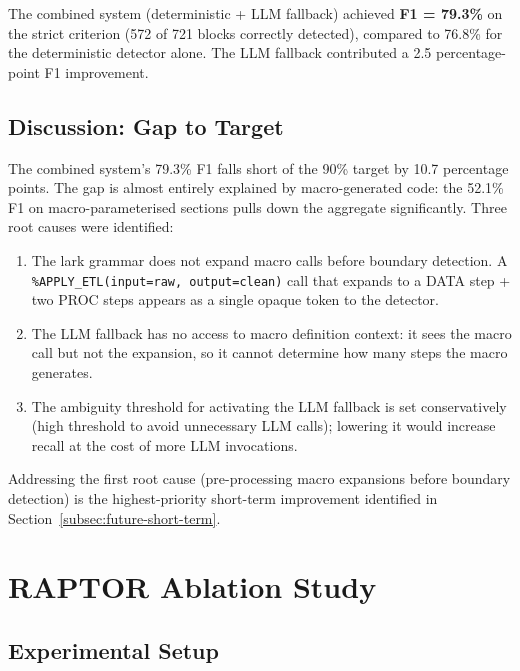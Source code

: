 The combined system (deterministic + LLM fallback) achieved \textbf{F1 = 79.3\%}
on the strict criterion (572 of 721 blocks correctly detected), compared to
76.8\% for the deterministic detector alone.
The LLM fallback contributed a 2.5 percentage-point F1 improvement.

\subsection{Discussion: Gap to Target}
\label{subsec:boundary-gap}

The combined system's 79.3\% F1 falls short of the 90\% target by 10.7
percentage points. The gap is almost entirely explained by macro-generated code:
the 52.1\% F1 on macro-parameterised sections pulls down the aggregate
significantly. Three root causes were identified:

\begin{enumerate}
  \item The lark grammar does not expand macro calls before boundary detection.
    A \texttt{\%APPLY\_ETL(input=raw, output=clean)} call that expands to a
    DATA step + two PROC steps appears as a single opaque token to the detector.
  \item The LLM fallback has no access to macro definition context: it sees
    the macro call but not the expansion, so it cannot determine how many steps
    the macro generates.
  \item The ambiguity threshold for activating the LLM fallback is set
    conservatively (high threshold to avoid unnecessary LLM calls); lowering it
    would increase recall at the cost of more LLM invocations.
\end{enumerate}

Addressing the first root cause (pre-processing macro expansions before boundary
detection) is the highest-priority short-term improvement identified in
Section~\ref{subsec:future-short-term}.

\section{RAPTOR Ablation Study}
\label{sec:raptor-results}

\subsection{Experimental Setup}
\label{subsec:ablation-setup}

